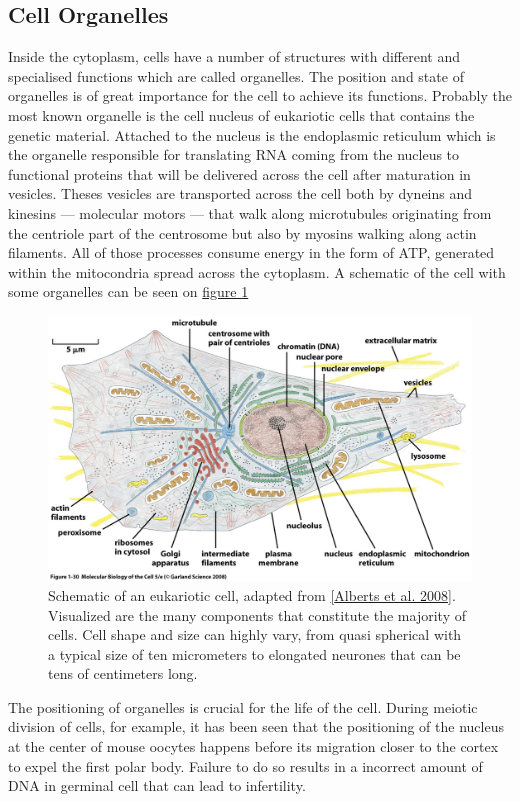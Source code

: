 \documentclass[A4paperpaper,11pt,english]{sphinxmanual}
\begin{document}
\subsection{Cell Organelles}
\label{index-latex:cell-organelles}
Inside the cytoplasm, cells have a number of structures with different and
specialised functions which are called organelles. The position and state of
organelles is of great importance for the cell to achieve its functions.
Probably the most known organelle is the cell nucleus of eukariotic cells that
contains the genetic material. Attached to the nucleus is the endoplasmic
reticulum  which is the organelle responsible for translating
RNA coming from the nucleus to functional proteins that will be delivered
across the cell after maturation in vesicles. Theses vesicles are
transported across the cell both by dyneins and kinesins — molecular motors —
that walk along microtubules originating from the centriole part of the
centrosome but also by myosins walking along actin filaments.  All of those processes
consume energy in  the form of ATP, generated within the mitocondria spread
across the cytoplasm. A schematic of the cell with some organelles can be seen
on \hyperref[index-latex:albertcell]{figure  \ref*{index-latex:albertcell}}
\begin{figure}[htbp]
\centering
\capstart

\includegraphics[width=0.800\linewidth]{figure-1-30.jpg}
\caption{Schematic of an eukariotic cell, adapted from {\hyperref[index-latex:alberts2008]{{[}Alberts et al. 2008{]}}}. Visualized are
the many components that constitute the majority of cells.  Cell shape and
size can highly vary, from quasi spherical with a typical size of ten
micrometers to elongated neurones that can be tens of centimeters long.}\label{index-latex:albertcell}\end{figure}

The positioning of organelles is crucial for the life of the cell. During
meiotic division of cells, for example, it has been seen that the positioning of
the nucleus at the center of mouse oocytes happens before its
migration closer to the cortex to expel the first polar body. Failure to do so
results in a incorrect amount of DNA in germinal cell that can lead to
infertility.
\end{document}
